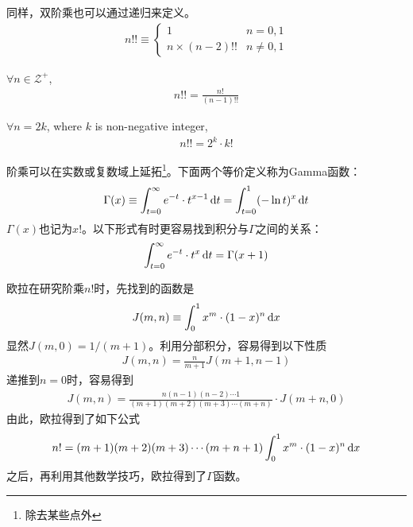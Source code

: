 \begin{definition}
  同样，双阶乘也可以通过递归来定义。
  \begin{align}
    n!!\equiv
    \begin{cases}
      1                & n=0, 1\\
      n\times (n-2)!!  & n\ne 0, 1
    \end{cases}
  \end{align}
\end{definition}

\begin{example}
  $\forall n\in\mathcal{Z}^+$,
  \begin{align}
    n!! = \frac{n!}{(n-1)!!}
  \end{align}

  $\forall n=2k$, where $k$ is non-negative integer,
  \begin{align}
    n!! = 2^k\cdot k!
  \end{align}
\end{example}


\begin{definition}[Gamma函数]
  阶乘可以在实数或复数域上延拓\footnote{除去某些点外}。下面两个等价定义称为Gamma函数：
  \begin{align}
    \Gamma(x) \equiv \int_{t=0}^\infty e^{-t} \cdot t^{x-1} \,\mathrm{d}t
    = \int_{t=0}^1 (-\ln t)^x \,\mathrm{d}t
  \end{align}
  $\Gamma(x)$也记为$x!$。以下形式有时更容易找到积分与$\Gamma$之间的关系：
  \begin{align}
    \int_{t=0}^\infty e^{-t} \cdot t^{x} \,\mathrm{d}t = \Gamma(x + 1)
  \end{align}
\end{definition}

\begin{example}
  欧拉在研究阶乘$n!$时，先找到的函数是
  \begin{align}
    J(m, n)\equiv\int_0^1 x^m\cdot (1-x)^n \,\mathrm{d}x
  \end{align}
  显然$J(m,0)=1/(m+1)$。利用分部积分，容易得到以下性质
  \begin{align}
    J(m,n)=\frac{n}{m+1}J(m+1,n-1)
  \end{align}
  递推到$n=0$时，容易得到
  \begin{align}
    J(m,n)=\frac{n(n-1)(n-2)\cdots 1}{(m+1)(m+2)(m+3)\cdots (m+n)}\cdot J(m+n,0)
  \end{align}
  由此，欧拉得到了如下公式
  \begin{align}
    n!=(m+1)(m+2)(m+3)\cdots (m+n+1)\int_0^1 x^m\cdot (1-x)^n\,\mathrm{d}x
  \end{align}
  之后，再利用其他数学技巧，欧拉得到了$\Gamma$函数。
\end{example}

